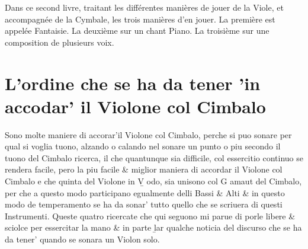 


Dans ce second livre, traitant les différentes manières de jouer de la Viole, et accompagnée de la Cymbale,
les trois manières d'en jouer. La première est appelée Fantaisie. La deuxième sur un chant Piano. %
La troisième sur une composition de plusieurs voix.




\chapter{L'ordine che se ha da tener 'in accodar' il Violone col Cimbalo}
Sono molte maniere di accorar'il Violone col Cimbalo, perche si puo sonare per qual si voglia tuono, alzando o calando nel sonare un punto o piu secondo il tuono del Cimbalo ricerca, il che quantunque sia difficile, col essercitio continuo se rendera facile, pero la piu facile \& miglior maniera di accordar il Violone col Cimbalo e che quinta del Violone in \b{V odo}, sia unisono col G amaut del Cimbalo, per che a questo modo participano egualmente delli Bassi \& Alti \& in questo modo de temperamento se ha da sonar' tutto quello che se scriuera di questi Instrumenti.
Queste quatro ricercate che qui seguono mi parue di porle libere \& sciolce per essercitar la mano \& in parte \b{lar} qualche noticia del discurso che se ha da tener' quando se sonara un Violon solo.